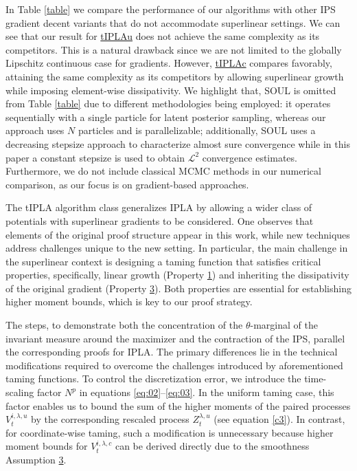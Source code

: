 \documentclass[a4paper, 10pt]{article}
\theoremstyle{plain}%
\begin{document}
\noindent In Table \ref{table} we compare the performance of our algorithms with other IPS gradient decent variants that do not accommodate superlinear settings. We can see that our result for \hyperref[algo1]{tIPLAu} does not achieve the same complexity as its competitors. This is a natural drawback since we are not limited to the globally Lipschitz continuous case for gradients. However, \hyperref[algo2]{tIPLAc} compares favorably, attaining the same complexity as its competitors by allowing superlinear growth while imposing element-wise dissipativity. We highlight that, SOUL \cite{Soul} is omitted from Table \ref{table} due to different methodologies being employed: it operates sequentially with a single particle for latent posterior sampling, whereas our approach uses $N$ particles and is parallelizable; additionally, SOUL \cite{Soul} uses a decreasing stepsize approach to characterize almost sure convergence while in this paper a constant stepsize is used to obtain $\mathcal{L}^2$ convergence estimates. Furthermore, we do not include classical MCMC methods in our numerical comparison, as our focus is on gradient-based approaches.\setlength{\parindent}{15pt}
\par\indent The tIPLA algorithm class generalizes IPLA \cite{Ipla} by allowing a wider class of potentials with superlinear gradients to be considered. One observes that elements of the original proof structure appear in this work, while new techniques address challenges unique to the new setting. In particular, the main challenge in the superlinear context is designing a taming function that satisfies critical properties, specifically, linear growth (Property \hyperlink{Property1}{1}) and inheriting the dissipativity of the original gradient (Property \hyperlink{Property3}{3}). Both properties are essential for establishing higher moment bounds, which is key to our proof strategy.\setlength{\parindent}{15pt}
\par\indent
 The steps, to demonstrate both the concentration of the $\theta$-marginal of the invariant measure around the maximizer and the contraction of the IPS, parallel the corresponding proofs for IPLA. The primary differences lie in the technical modifications required to overcome the challenges introduced by aforementioned taming functions. To control the discretization error, we introduce the time-scaling factor $N^p$ in equations \eqref{eq:02}–\eqref{eq:03}. In the uniform taming case, this factor enables us to bound the sum of the higher moments of the paired processes $V_t^{i,\lambda,u}$ by the corresponding rescaled process $Z_t^{\lambda,u}$ (see equation \eqref{c3}). In contrast, for coordinate-wise taming, such a modification is unnecessary because higher moment bounds for $V_t^{i,\lambda,c}$ can be derived directly due to the smoothness Assumption \hyperlink{Assum3a}{3}.
\end{document}
